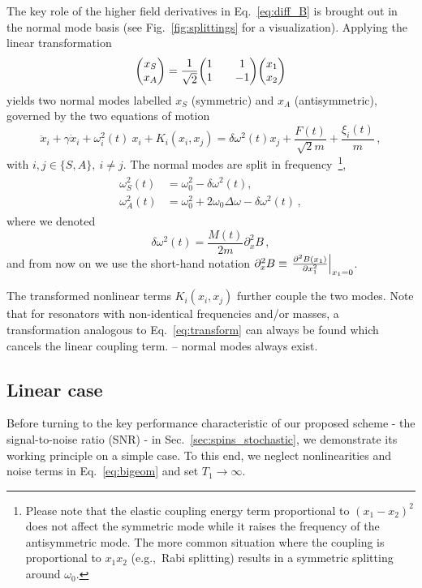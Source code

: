 The key role of the higher field derivatives in Eq.~\eqref{eq:diff_B} is brought out in the normal mode basis (see Fig.~\ref{fig:splittings} for a visualization). Applying the linear transformation
\begin{equation} \label{eq:transform}
\mqty(x_S \\ x_A) = \frac{1}{\sqrt{2}}\mqty(1 && 1 \\ 1 && -1) \mqty(x_1 \\ x_2)
\end{equation}
yields two normal modes labelled $x_S$ (symmetric) and $x_A$ (antisymmetric), governed by the two equations of motion
\begin{equation} \label{eq:bigeom}
\ddot{x}_i + \gamma \dot{x}_i +\omega_i^2(t) \: x_i + K_i(x_i, x_j) =  \delta\omega^2(t) x_j + \frac{F(t)}{\sqrt{2} m} + \frac{\xi_i(t)}{m} \,,
\end{equation}
with $i,j \in \{S,A\}, \: i \neq j$. The normal modes are split in frequency~\footnote{Please note that the elastic coupling energy term proportional to $(x_1-x_2)^2$ does not affect the symmetric mode while it raises the frequency of the antisymmetric mode. The more common situation where the coupling is proportional to $x_1 x_2$ (e.g.,~Rabi splitting) results in a symmetric splitting around $\omega_0$.},
\begin{align} \label{eq:normal_basis}
\begin{split}
\omega_S^2(t) &= \omega_0^2 - \delta\omega^2(t), \\
\omega_A^2(t) &= \omega_0^2 + 2 \omega_0 \Delta \omega- \delta\omega^2(t) \,,
\end{split}
\end{align}
where we denoted
\begin{equation} \label{eq:deltaomega}
\delta\omega^2(t) = \frac{M(t)}{2 m} \partial^2_x B \,,
\end{equation}
and from now on we use the short-hand notation $\partial^2_x B \equiv \eval{\frac{\partial^2 B(x_1)}{\partial x_1^2}}_{x_1 = 0}$. 

The transformed nonlinear terms $K_i(x_i, x_j)$ further couple the two modes. Note that for resonators with non-identical frequencies and/or masses, a transformation analogous to Eq.~\eqref{eq:transform} can always be found which cancels the linear coupling term. -- normal modes always exist.

\subsection{Linear case} \label{sec:linear}
Before turning to the key performance characteristic of our proposed scheme - the signal-to-noise ratio (SNR) - in Sec.~\ref{sec:spins_stochastic}, we demonstrate its working principle on a simple case. To this end, we neglect nonlinearities and noise terms in Eq.~\eqref{eq:bigeom} and set $T_1 \rightarrow \infty$.

